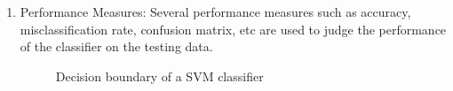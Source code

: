 \documentclass[letterpaper,12pt, onecolumn]{article}%
\begin{document}
\begin{enumerate}
\item Performance Measures: Several performance measures such as accuracy, misclassification rate, confusion matrix, etc are used to judge the performance of the classifier on the testing data. 
\begin{figure}[!hbtp]
 	  \centering
  		\quad
 	   \caption{Decision boundary of a SVM classifier }
       \label{fig:deci_bndry}
\end{figure}

\end{enumerate}
\end{document}
